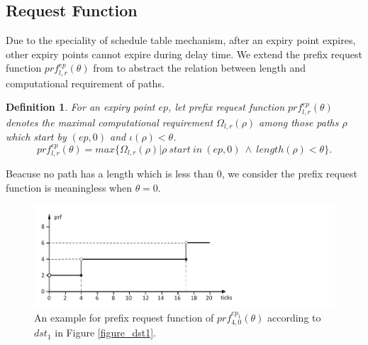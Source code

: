 \documentclass[10pt,conference]{IEEEtran}
\newtheorem{definition}{Definition}
\begin{document}
\subsection{Request Function}\label{section_prf}
Due to the speciality of schedule table mechanism, after an expiry point expires, other expiry points cannot expire during delay time. We extend the prefix request function $prf^{ep}_{l,r}(\theta)$ from \cite{DBLP:journals/rts/Stigge015a}  to abstract the relation between length and computational requirement of paths.
\begin{definition}
For an expiry point $ep$, let prefix request function $prf^{ep}_{l,r}(\theta)$ denotes the maximal computational requirement $\Omega_{l,r}(\rho)$ among those paths $\rho$ which start by $(ep,0)$ and $\iota(\rho)<\theta$.
\begin{equation}
prf^{ep}_{l,r}(\theta)=max\{\Omega_{l,r}(\rho)|\rho \ start\ in\ (ep,0)\ \wedge\ length(\rho)<\theta\}.
\end{equation}\label{equation_prf}
\end{definition}

Beacuse no path has a length which is less than 0, we consider the prefix request function is meaningless when $\theta=0$.


\begin{figure}[t]
  \centering
  \includegraphics[scale=0.51]{graphics/figure_prf-eps-converted-to.pdf}
  \caption{An example for prefix request function of $prf^{ep_1}_{4,0}(\theta)$ according to $dst_1$ in Figure \ref{figure_dst1}.} 
  \label{figure_prf}
\end{figure}
\end{document}
